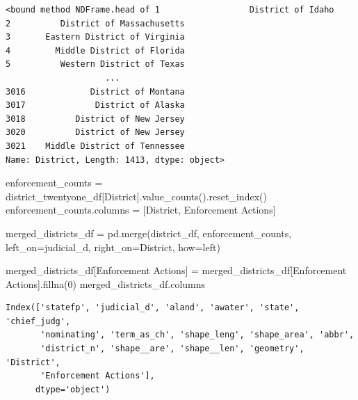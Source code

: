 \documentclass[
  letterpaper,
  DIV=11,
  numbers=noendperiod]{scrartcl}
\newenvironment{Shaded}{\begin{snugshade}}{\end{snugshade}}
\newcommand{\DecValTok}[1]{\textcolor[rgb]{0.68,0.00,0.00}{#1}}
\newcommand{\NormalTok}[1]{\textcolor[rgb]{0.00,0.23,0.31}{#1}}
\newcommand{\OperatorTok}[1]{\textcolor[rgb]{0.37,0.37,0.37}{#1}}
\newcommand{\StringTok}[1]{\textcolor[rgb]{0.13,0.47,0.30}{#1}}
\begin{document}
\begin{verbatim}
<bound method NDFrame.head of 1                  District of Idaho
2          District of Massachusetts
3       Eastern District of Virginia
4         Middle District of Florida
5          Western District of Texas
                    ...             
3016             District of Montana
3017              District of Alaska
3018          District of New Jersey
3020          District of New Jersey
3021    Middle District of Tennessee
Name: District, Length: 1413, dtype: object>
\end{verbatim}

\begin{Shaded}
\begin{Highlighting}[]
\NormalTok{enforcement\_counts }\OperatorTok{=}\NormalTok{ district\_twentyone\_df[}\StringTok{\textquotesingle{}District\textquotesingle{}}\NormalTok{].value\_counts().reset\_index()}
\NormalTok{enforcement\_counts.columns }\OperatorTok{=}\NormalTok{ [}\StringTok{\textquotesingle{}District\textquotesingle{}}\NormalTok{, }\StringTok{\textquotesingle{}Enforcement Actions\textquotesingle{}}\NormalTok{]}
\end{Highlighting}
\end{Shaded}

\begin{Shaded}
\begin{Highlighting}[]
\NormalTok{merged\_districts\_df }\OperatorTok{=}\NormalTok{ pd.merge(district\_df, enforcement\_counts, left\_on}\OperatorTok{=}\StringTok{\textquotesingle{}judicial\_d\textquotesingle{}}\NormalTok{, right\_on}\OperatorTok{=}\StringTok{\textquotesingle{}District\textquotesingle{}}\NormalTok{, how}\OperatorTok{=}\StringTok{\textquotesingle{}left\textquotesingle{}}\NormalTok{)}

\NormalTok{merged\_districts\_df[}\StringTok{\textquotesingle{}Enforcement Actions\textquotesingle{}}\NormalTok{] }\OperatorTok{=}\NormalTok{ merged\_districts\_df[}\StringTok{\textquotesingle{}Enforcement Actions\textquotesingle{}}\NormalTok{].fillna(}\DecValTok{0}\NormalTok{)}
\NormalTok{merged\_districts\_df.columns}
\end{Highlighting}
\end{Shaded}

\begin{verbatim}
Index(['statefp', 'judicial_d', 'aland', 'awater', 'state', 'chief_judg',
       'nominating', 'term_as_ch', 'shape_leng', 'shape_area', 'abbr',
       'district_n', 'shape__are', 'shape__len', 'geometry', 'District',
       'Enforcement Actions'],
      dtype='object')
\end{verbatim}
\end{document}
